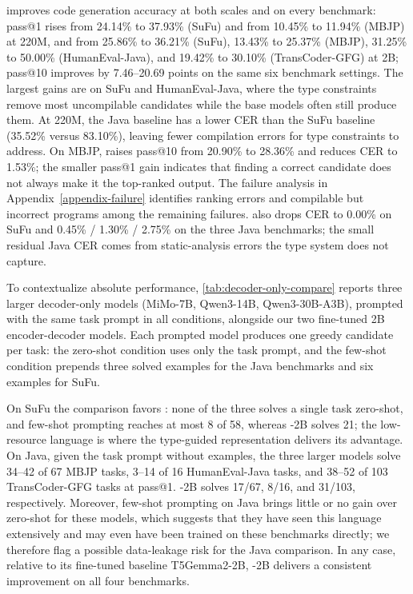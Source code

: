 \mainname improves code generation accuracy at both scales and on every benchmark: pass@1 rises from 24.14\% to 37.93\% (SuFu) and from 10.45\% to 11.94\% (MBJP) at 220M, and from 25.86\% to 36.21\% (SuFu), 13.43\% to 25.37\% (MBJP), 31.25\% to 50.00\% (HumanEval-Java), and 19.42\% to 30.10\% (TransCoder-GFG) at 2B; pass@10 improves by 7.46--20.69 points on the same six benchmark settings.
The largest gains are on SuFu and HumanEval-Java, where the type constraints remove most uncompilable candidates while the base models often still produce them.
At 220M, the Java baseline has a lower CER than the SuFu baseline (35.52\% versus 83.10\%), leaving fewer compilation errors for type constraints to address. On MBJP, \mainname{} raises pass@10 from 20.90\% to 28.36\% and reduces CER to 1.53\%; the smaller pass@1 gain indicates that finding a correct candidate does not always make it the top-ranked output. The failure analysis in Appendix~\ref{appendix-failure} identifies ranking errors and compilable but incorrect programs among the remaining failures.
\mainname{} also drops CER to 0.00\% on SuFu and 0.45\% / 1.30\% / 2.75\% on the three Java benchmarks; the small residual Java CER comes from static-analysis errors the type system does not capture.

To contextualize absolute performance, \autoref{tab:decoder-only-compare} reports three larger decoder-only models (MiMo-7B, Qwen3-14B, Qwen3-30B-A3B), prompted with the same task prompt in all conditions, alongside our two fine-tuned 2B encoder-decoder models.
Each prompted model produces one greedy candidate per task: the zero-shot condition uses only the task prompt, and the few-shot condition prepends three solved examples for the Java benchmarks and six examples for SuFu.

On SuFu the comparison favors \mainname{}: none of the three solves a single task zero-shot, and few-shot prompting reaches at most 8 of 58, whereas \mainname-2B solves 21; the low-resource language is where the type-guided representation delivers its advantage.
On Java, given the task prompt without examples, the three larger models solve 34--42 of 67 MBJP tasks, 3--14 of 16 HumanEval-Java tasks, and 38--52 of 103 TransCoder-GFG tasks at pass@1. \mainname-2B solves 17/67, 8/16, and 31/103, respectively. Moreover, few-shot prompting on Java brings little or no gain over zero-shot for these models, which suggests that they have seen this language extensively and may even have been trained on these benchmarks directly; we therefore flag a possible data-leakage risk for the Java comparison.
In any case, relative to its fine-tuned baseline T5Gemma2-2B, \mainname-2B delivers a consistent improvement on all four benchmarks.

